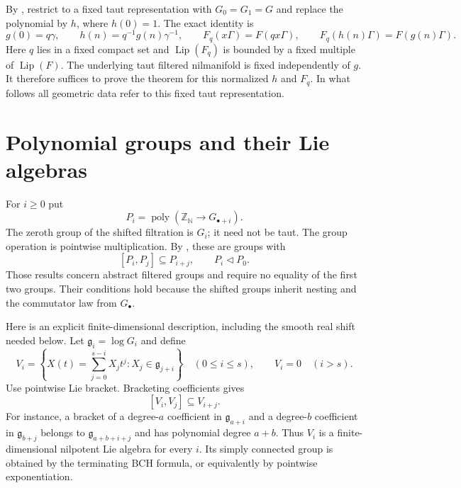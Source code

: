 \documentclass[11pt]{article}
\newcommand{\Z}{\mathbb Z}
\newcommand{\N}{\mathbb N}
\newcommand{\poly}{\operatorname{poly}}
\newcommand{\fg}{\mathfrak g}
\begin{document}
By \cite[Theorem 1]{Taut}, restrict to a fixed taut representation with
$G_0=G_1=G$ and replace the polynomial by $h$, where $h(0)=1$.
The exact identity is
\[
 g(0)=q\gamma,\qquad h(n)=q^{-1}g(n)\gamma^{-1},\qquad
 F_q(x\Gamma)=F(qx\Gamma),\qquad
 F_q(h(n)\Gamma)=F(g(n)\Gamma).
\]
Here $q$ lies in a fixed compact set and
$\operatorname{Lip}(F_q)$ is bounded by a fixed multiple of
$\operatorname{Lip}(F)$. The underlying taut filtered nilmanifold is fixed
independently of $g$. It therefore suffices to prove the theorem for this
normalized $h$ and $F_q$. In what follows all geometric data refer to this
fixed taut representation.

\section{Polynomial groups and their Lie algebras}

For $i\geq0$ put
\[
 P_i=\poly(\Z_\N\longrightarrow G_{\bullet+i}).
\]
The zeroth group of the shifted filtration is $G_i$; it need not be taut.
The group operation is pointwise multiplication.
By \cite[Corollary B.4 and Proposition B.6]{GTZ}, these are groups with
\begin{equation}\label{eq:polyfiltered}
 [P_i,P_j]\subseteq P_{i+j},\qquad P_i\triangleleft P_0.
\end{equation}
Those results concern abstract filtered groups and require no equality of
the first two groups. Their conditions hold because the shifted groups
inherit nesting and the commutator law from $G_\bullet$.

Here is an explicit finite-dimensional description, including the smooth
real shift needed below. Let $\fg_i=\log G_i$ and define
\[
 V_i=\left\{X(t)=\sum_{j=0}^{s-i} X_jt^j:X_j\in\fg_{j+i}\right\}
 \quad(0\leq i\leq s),\qquad V_i=0\quad(i>s).
\]
Use pointwise Lie bracket. Bracketing coefficients gives
\begin{equation}\label{eq:Vbracket}
 [V_i,V_j]\subseteq V_{i+j}.
\end{equation}
For instance, a bracket of a degree-$a$ coefficient in $\fg_{a+i}$ and a
degree-$b$ coefficient in $\fg_{b+j}$ belongs to $\fg_{a+b+i+j}$ and has
polynomial degree $a+b$. Thus $V_i$ is a finite-dimensional nilpotent Lie
algebra for every $i$. Its simply connected group is obtained by the
terminating BCH formula, or equivalently by pointwise exponentiation.
\end{document}
